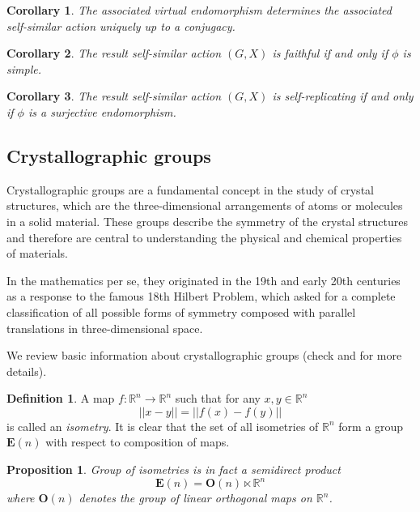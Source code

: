 \documentclass[a4paper,12pt]{amsart}
\newtheorem{proposition}[theorem]{Proposition}
\newtheorem{corollary}{Corollary}[theorem]
\theoremstyle{definition}
\newtheorem{definition}{Definition}
\begin{document}
	\begin{corollary}
		The associated virtual endomorphism determines the associated self-similar action uniquely up to a conjugacy.
	\end{corollary}

	\begin{corollary}
		The result self-similar action $(G, X)$ is faithful if and only if $\phi$ is simple. 
	\end{corollary}
	
	\begin{corollary}
		The result self-similar action $(G, X)$ is self-replicating if and only if $\phi$ is a surjective endomorphism.
	\end{corollary}
	
	
	\subsection{Crystallographic groups} Crystallographic groups are a fundamental concept in the study of crystal structures, which are the three-dimensional arrangements of atoms or molecules in a solid material. These groups describe the symmetry of the crystal structures and therefore are central to understanding the physical and chemical properties of materials. 
	
	In the mathematics per se, they originated in the 19th and early 20th centuries as a response to the famous 18th Hilbert Problem, which asked for a complete classification of all possible forms of symmetry composed with parallel translations in three-dimensional space. 	
	
	We review basic information about crystallographic groups (check \cite{cryst:group_theory} and \cite{cryst:geometry_of_cryst} for more details).
	
	
	\begin{definition}
		A map $f: \mathbb{R}^n \rightarrow \mathbb{R}^n$ such that for any $x, y \in \mathbb{R}^n$
		$$
		||x - y|| = ||f(x) - f(y)||
		$$
		is called an \textit{isometry}.  
		It is clear that the set of all isometries of $\mathbb{R}^n$ form a group $\mathbf{E}(n)$ with respect to composition of maps.
	\end{definition}
	
	
	\begin{proposition} Group of isometries is in fact a semidirect product
		$$\mathbf{E}(n) = \mathbf{O}(n) \ltimes \mathbb{R}^n$$
		where $\mathbf{O}(n)$ denotes the group of linear orthogonal maps on $\mathbb{R}^n$.
	\end{proposition}
	
\end{document}
